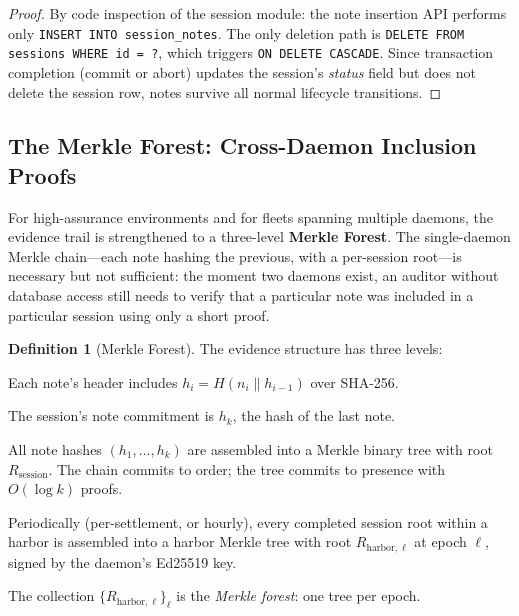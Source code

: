\documentclass[11pt,a4paper]{article}
\theoremstyle{definition}
\newtheorem{definition}{Definition}[section]
\theoremstyle{remark}
\begin{document}
\begin{proof}
\setlength{\parskip}{4pt plus 1pt}
By code inspection of the session module: the note insertion API performs only \texttt{INSERT INTO session\_notes}. The only deletion path is \texttt{DELETE FROM sessions WHERE id = ?}, which triggers \texttt{ON DELETE CASCADE}. Since transaction completion (commit or abort) updates the session's \emph{status} field but does not delete the session row, notes survive all normal lifecycle transitions.
\end{proof}

\subsection{The Merkle Forest: Cross-Daemon Inclusion Proofs}\label{sec:merkle-forest}

For high-assurance environments and for fleets spanning multiple daemons, the evidence trail is strengthened to a three-level \textbf{Merkle Forest}. The single-daemon Merkle chain---each note hashing the previous, with a per-session root---is necessary but not sufficient: the moment two daemons exist, an auditor without database access still needs to verify that a particular note was included in a particular session using only a short proof.

\begin{definition}[Merkle Forest]\label{def:merkle-forest}
\setlength{\parskip}{4pt plus 1pt}
The evidence structure has three levels:
\begin{description}[nosep]
  \item[Note chain.] Each note's header includes $h_i = H(n_i \mathbin{\|} h_{i-1})$ over SHA-256. 

The session's note commitment is $h_k$, the hash of the last note.
  

\item[Session root.] All note hashes $(h_1,\ldots,h_k)$ are assembled into a Merkle binary tree with root $R_{\text{session}}$. The chain commits to order; the tree commits to presence with $O(\log k)$ proofs.
  \item[Harbor root.] Periodically (per-settlement, or hourly), every completed session root within a harbor is assembled into a harbor Merkle tree with root $R_{\text{harbor},\ell}$ at epoch $\ell$, signed by the daemon's Ed25519 key.
\end{description}
The collection $\{R_{\text{harbor},\ell}\}_{\ell}$ is the \emph{Merkle forest}: one tree per epoch.
\end{definition}
\end{document}
